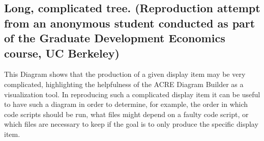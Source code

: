 \documentclass[]{book}
\begin{document}
\hypertarget{long-complicated-tree.-reproduction-attempt-from-an-anonymous-student-conducted-as-part-of-the-graduate-development-economics-course-uc-berkeley}{%
\subsection{Long, complicated tree. (Reproduction attempt from an anonymous student conducted as part of the Graduate Development Economics course, UC Berkeley)}\label{long-complicated-tree.-reproduction-attempt-from-an-anonymous-student-conducted-as-part-of-the-graduate-development-economics-course-uc-berkeley}}

This Diagram shows that the production of a given display item may be very complicated, highlighting the helpfulness of the ACRE Diagram Builder as a visualization tool. In reproducing such a complicated display item it can be useful to have such a diagram in order to determine, for example, the order in which code scripts should be run, what files might depend on a faulty code script, or which files are necessary to keep if the goal is to only produce the specific display item.
\end{document}
